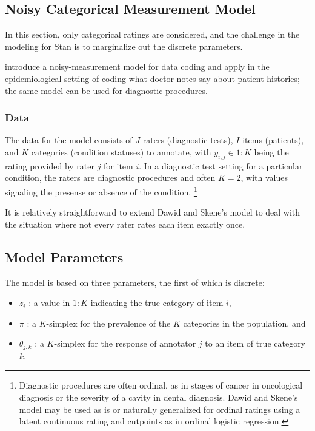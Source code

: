 \subsection{Noisy Categorical Measurement Model}

In this section, only categorical ratings are considered, and the
challenge in the modeling for Stan is to marginalize out the discrete
parameters.  

\cite{DawidSkene:1979} introduce a noisy-measurement model for
data coding and apply in the epidemiological setting of coding what
doctor notes say about patient histories;  the same model can be used
for diagnostic procedures.

\subsubsection{Data}

The data for the model consists of $J$ raters (diagnostic tests), $I$
items (patients), and $K$ categories (condition statuses) to annotate,
with $y_{i,j} \in 1{:}K$ being the rating provided by rater $j$ for
item $i$.  In a diagnostic test setting for a particular condition,
the raters are diagnostic procedures and often $K=2$, with values
signaling the presense or absence of the condition.%
%
\footnote{Diagnostic procedures are often ordinal, as in stages of
  cancer in oncological diagnosis or the severity of a cavity in
  dental diagnosis.  Dawid and Skene's model may be used as is or
  naturally generalized for ordinal ratings using a latent continuous
  rating and cutpoints as in ordinal logistic regression.}

It is relatively straightforward to extend Dawid and Skene's model to
deal with the situation where not every rater rates each item exactly
once.

\subsection{Model Parameters}

The model is based on three parameters, the first of which is discrete:
%
\begin{itemize}
\item $z_i$ : a value in $1{:}K$ indicating the true category of item $i$,
\item $\pi$ : a $K$-simplex for the prevalence of the $K$
  categories in the population, and
\item $\theta_{j,k}$ : a $K$-simplex for the response of annotator $j$
  to an item of true category $k$.
\end{itemize}

